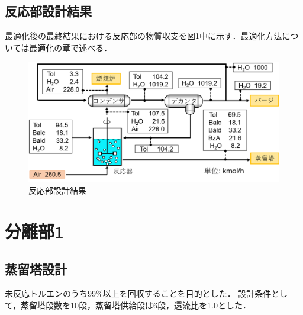 \documentclass[a4j]{jsreport}
\begin{document}
\section{反応部設計結果}
最適化後の最終結果における反応部の物質収支を図\ref{反応部設計結果の図}中に示す．最適化方法については最適化の章で述べる．
\begin{figure}[htbp]
    \begin{center}
        \includegraphics[scale=0.7]{ReactionSectionConclusion.png}
        \caption{反応部設計結果}
        \label{反応部設計結果の図}
    \end{center}
\end{figure}


\newpage
\chapter{分離部1}
\section{蒸留塔設計}
未反応トルエンのうち99\%以上を回収することを目的とした．
設計条件として，蒸留塔段数を10段，蒸留塔供給段は6段，還流比を1.0とした．
\end{document}
